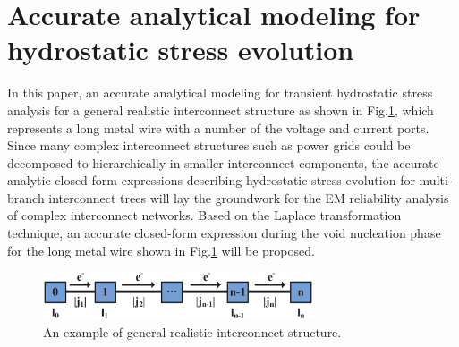 \section{Accurate analytical modeling for hydrostatic stress evolution}
In this paper, an accurate analytical modeling for transient hydrostatic stress analysis for a general realistic interconnect structure as shown in Fig.\ref{fig:interconnect_tree}, which represents a long metal wire with a number of the voltage and current ports. Since many complex interconnect structures such as power grids could be decomposed to hierarchically in smaller interconnect components, the accurate analytic closed-form expressions describing hydrostatic stress evolution for multi-branch interconnect trees will lay the groundwork for the EM reliability analysis of complex interconnect networks. Based on the Laplace transformation technique, an accurate closed-form expression during the void nucleation phase for the long metal wire shown in Fig.\ref{fig:interconnect_tree} will be proposed.
\label{sec:analytical_stress}
\begin{figure}[ht] \centering
\includegraphics[width=80mm]{Sn.eps}
\caption{An example of general realistic interconnect structure.}
  \label{fig:interconnect_tree}
  \vspace{-0.12in}
\end{figure}

